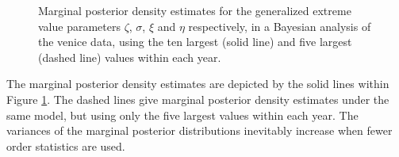 \documentclass[11pt,a4paper]{article}
\begin{document}
\begin{figure}
\begin{center}
\vspace{-1.5cm}
\hspace{-0.5cm}
\hspace{-0.5cm}
\hspace{-0.5cm}
\end{center}
\caption{Marginal posterior density estimates for the generalized extreme value parameters $\zeta$, $\sigma$, $\xi$ and $\eta$ respectively, in a Bayesian analysis of the venice data, using the ten largest (solid line) and five largest (dashed line) values within each year.}
\label{vendens}
\end{figure}

The marginal posterior density estimates are depicted by the solid lines within Figure \ref{vendens}. 
The dashed lines give marginal posterior density estimates under the same model, but using only the five largest values within each year.  
The variances of the marginal posterior distributions inevitably increase when fewer order statistics are used.


\end{document}

